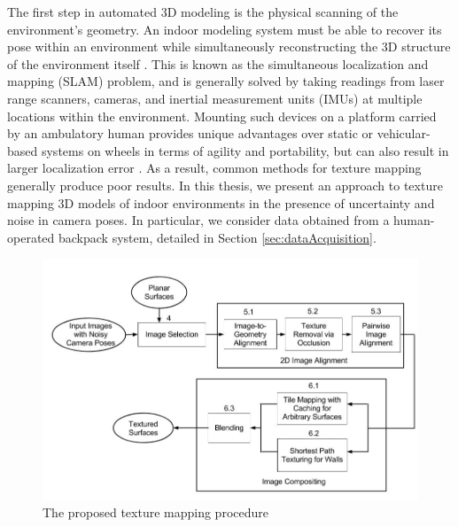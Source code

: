 \documentclass[]{spie}  %
\begin{document}
The first step in automated 3D modeling is the physical scanning of
the environment's geometry. An indoor modeling system must be able to
recover its pose within an environment while simultaneously
reconstructing the 3D structure of the environment itself
\cite{chen2010indoor, hz, kua2012loopclosure, liu2010indoor}. This is
known as the simultaneous localization and mapping (SLAM) problem, and
is generally solved by taking readings from laser range scanners,
cameras, and inertial measurement units (IMUs) at multiple locations
within the environment. Mounting such devices on a platform carried by
an ambulatory human provides unique advantages over static or
vehicular-based systems on wheels in terms of agility and portability,
but can also result in larger localization error
\cite{liu2010indoor}. As a result, common methods for texture mapping
generally produce poor results. In this thesis, we present an approach
to texture mapping 3D models of indoor environments in the presence of
uncertainty and noise in camera poses. In particular, we consider data
obtained from a human-operated backpack system, detailed in Section
\ref{sec:dataAcquisition}.


\begin{figure}
  \centering
  \includegraphics[width=6in]{flowchart.jpg}
  \caption{The proposed texture mapping procedure\\}
  \label{fig:flowchart}
\end{figure}
\end{document}
